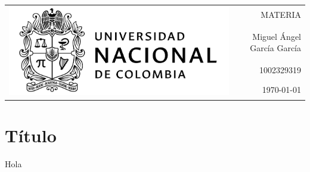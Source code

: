 \documentclass[11pt]{article} %
\begin{document}
	
	\onehalfspacing %
	\setlength{\parskip}{\baselineskip} %
	
	\noindent %
	\begin{tabularx}{\textwidth}{Y r}
		 & MATERIA\\
		& Miguel Ángel García García\\
		& 1002329319\\ 
		& \today\\
	\end{tabularx}

	\vspace{15pt}
			
	\section*{Título}
		
	\noindent	
	Hola
	
%	
%	
\end{document}
